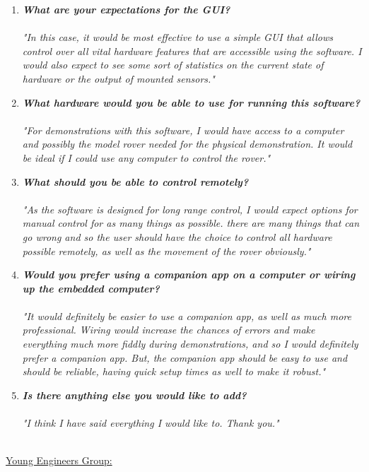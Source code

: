 \documentclass[11pt]{report}
\begin{document}
				\begin{enumerate}
					\item{\emph{\textbf{What are your expectations for the GUI?}}}\\\\
					\emph{"In this case, it would be most effective to use a simple GUI that allows control over all vital hardware features that are accessible using the software. I would also expect to see some sort of statistics on the current state of hardware or the output of mounted sensors."}
					\item{\emph{\textbf{What hardware would you be able to use for running this software?}}}\\\\
					\emph{"For demonstrations with this software,  I would have access to a computer and possibly the model rover needed for the physical demonstration. It would be ideal if I could use any computer to control the rover."}
					\item{\emph{\textbf{What should you be able to control remotely?}}}\\\\
					\emph{"As the software is designed for long range control, I would expect options for manual control for as many things as possible. there are many things that can go wrong and so the user should have the choice to control all hardware possible remotely, as well as the movement of the rover obviously."}
					\item{\emph{\textbf{Would you prefer using a companion app on a computer or wiring up the embedded computer?}}}\\\\
					\emph{"It would definitely be easier to use a companion app, as well as much more professional. Wiring would increase the chances of errors and make everything much more fiddly during demonstrations, and so I would definitely prefer a companion app. But, the companion app should be easy to use and should be reliable, having quick setup times as well to make it robust."}
					\item{\emph{\textbf{Is there anything else you would like to add?}}}\\\\
					\emph{"I think I have said everything I would like to. Thank you."}
				\end{enumerate}
			~\\
			\underline{Young Engineers Group:}
\end{document}
